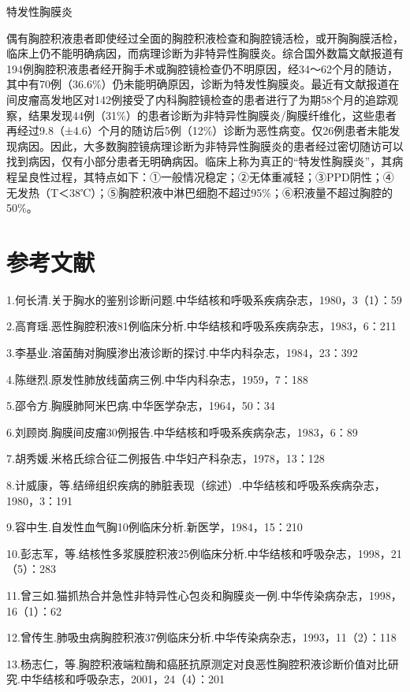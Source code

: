 特发性胸膜炎

偶有胸腔积液患者即使经过全面的胸腔积液检查和胸腔镜活检，或开胸胸膜活检，临床上仍不能明确病因，而病理诊断为非特异性胸膜炎。综合国外数篇文献报道有194例胸腔积液患者经开胸手术或胸腔镜检查仍不明原因，经34～62个月的随访，其中有70例（36.6\%）仍未能明确原因，诊断为特发性胸膜炎。最近有文献报道在间皮瘤高发地区对142例接受了内科胸腔镜检查的患者进行了为期58个月的追踪观察，结果发现44例（31\%）的患者诊断为非特异性胸膜炎/胸膜纤维化，这些患者再经过9.8（±4.6）个月的随访后5例（12\%）诊断为恶性病变。仅26例患者未能发现病因。因此，大多数胸腔镜病理诊断为非特异性胸膜炎的患者经过密切随访可以找到病因，仅有小部分患者无明确病因。临床上称为真正的“特发性胸膜炎”，其病程呈良性过程，其特点如下：①一般情况稳定；②无体重减轻；③PPD阴性；④无发热（T＜38℃）；⑤胸腔积液中淋巴细胞不超过95\%；⑥积液量不超过胸腔的50\%。

\protect\hypertarget{text00078.html}{}{}

\section{参考文献}

1.何长清.关于胸水的鉴别诊断问题.中华结核和呼吸系疾病杂志，1980，3（1）：59

2.高育瑶.恶性胸腔积液81例临床分析.中华结核和呼吸系疾病杂志，1983，6：211

3.李基业.溶菌酶对胸膜渗出液诊断的探讨.中华内科杂志，1984，23：392

4.陈继烈.原发性肺放线菌病三例.中华内科杂志，1959，7：188

5.邵令方.胸膜肺阿米巴病.中华医学杂志，1964，50：34

6.刘顾岗.胸膜间皮瘤30例报告.中华结核和呼吸系疾病杂志，1983，6：89

7.胡秀媛.米格氏综合征二例报告.中华妇产科杂志，1978，13：128

8.计威康，等.结缔组织疾病的肺脏表现（综述）.中华结核和呼吸系疾病杂志，1980，3：191

9.容中生.自发性血气胸10例临床分析.新医学，1984，15：210

10.彭志军，等.结核性多浆膜腔积液25例临床分析.中华结核和呼吸杂志，1998，21（5）：283

11.曾三如.猫抓热合并急性非特异性心包炎和胸膜炎一例.中华传染病杂志，1998，16（1）：62

12.曾传生.肺吸虫病胸腔积液37例临床分析.中华传染病杂志，1993，11（2）：118

13.杨志仁，等.胸腔积液端粒酶和癌胚抗原测定对良恶性胸腔积液诊断价值对比研究.中华结核和呼吸杂志，2001，24（4）：201

